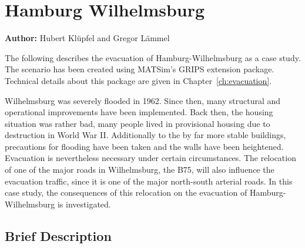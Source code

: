 
%
\section{Hamburg Wilhelmsburg}
\label{ch:sc:hhw}
\hfill \textbf{Author:} Hubert Klüpfel and Gregor Lämmel

The following describes the evacuation of Hamburg-Wilhelmsburg as a case study. 
The scenario has been created using MATSim's GRIPS extension package. Technical details about this package are given in Chapter~\ref{ch:evacuation}. 

Wilhelmsburg was severely flooded in 1962. Since then, many structural and operational improvements have been implemented. Back then, the housing situation was rather bad, many people lived in provisional housing due to destruction in World War II. Additionally to the by far more stable buildings, precautions for flooding have been taken and the walls have been heightened. Evacuation is nevertheless necessary under certain circumstances. The relocation of one of the major roads in Wilhelmsburg, the B75, will also influence the evacuation traffic, since it is one of the major north-south arterial roads. In this case study, the consequences of this relocation on the evacuation of Hamburg-Wilhelmsburg is investigated.

\subsection{Brief Description}

